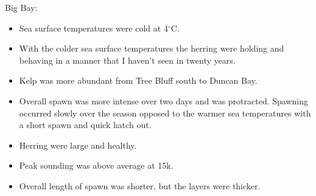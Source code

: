 Big Bay:

\begin{itemize}

\item Sea surface temperatures were cold at 4$^\circ\text{C}$.

\item With the colder sea surface temperatures the herring were holding and
behaving in a manner that I haven't seen in twenty years.

\item Kelp was more abundant from Tree Bluff south to Duncan Bay. 

\item Overall spawn was more intense over two days and was protracted.
Spawning occurred slowly over the season opposed to the warmer sea temperatures with a short spawn and quick hatch out.

\item Herring were large and healthy.

\item Peak sounding was above average at 15k.

\item Overall length of spawn was shorter, but the layers were thicker.

\end{itemize}